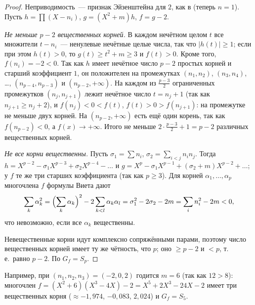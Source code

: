 \begin{proof}
Неприводимость~--- признак Эйзенштейна для $2$, как в  (теперь $n=1$). Пусть $h=\prod(X-n_i)$, $g=(X^2+m)h$, $f=g-2$.

\emph{Не меньше $p-2$ вещественных корней.} В каждом нечётном целом $t$ все множители $t-n_i$~--- ненулевые нечётные
целые числа, так что $|h(t)|\ge1$; если при этом $h(t)>0$, то $g(t)\ge t^2+m\ge3$ и $f(t)>0$. Кроме того, $f(n_i)=-2<0$.
Так как $h$ имеет нечётное число $p-2$ простых корней и старший коэффициент $1$, он положителен на промежутках
$(n_1,n_2)$, $(n_3,n_4)$, \dots, $(n_{p-4},n_{p-3})$ и $(n_{p-2},+\infty)$. На каждом из $\frac{p-3}2$ ограниченных
промежутков $(n_j,n_{j+1})$ лежит нечётное число $t=n_j+1$ (так как $n_{j+1}\ge n_j+2$), и $f(n_j)<0<f(t)$, $f(t)>0>f(n_{j+1})$:
на промежутке не меньше двух корней. На $(n_{p-2},+\infty)$ есть ещё один корень, так как $f(n_{p-2})<0$, а
$f(x)\to+\infty$. Итого не меньше $2\cdot\frac{p-3}2+1=p-2$ различных вещественных корней.

\emph{Не все корни вещественны.} Пусть $\sigma_1=\sum n_i$, $\sigma_2=\sum_{i<j}n_in_j$. Тогда $h=X^{p-2}-\sigma_1X^{p-3}+\sigma_2X^{p-4}-\dots$ и
$g=X^p-\sigma_1X^{p-1}+(\sigma_2+m)X^{p-2}+\dots$; у $f$ те же три старших коэффициента (так как $p\ge3$). Для корней
$\alpha_1,\dots,\alpha_p$ многочлена $f$ формулы Виета дают
\[
\sum_k\alpha_k^2=\Bigl(\sum_k\alpha_k\Bigr)^2-2\sum_{k<l}\alpha_k\alpha_l=\sigma_1^2-2\sigma_2-2m=\sum_in_i^2-2m<0,
\]
что невозможно, если все $\alpha_k$ вещественны.

Невещественные корни идут комплексно сопряжёнными парами, поэтому число вещественных корней имеет ту же чётность, что
$p$; оно $\ge p-2$ и $<p$, т.\,е.\ равно $p-2$. По  $G_f=S_p$.
\end{proof}

Например, при $(n_1,n_2,n_3)=(-2,0,2)$ годится $m=6$ (так как $12>8$): многочлен
$f=(X^2+6)(X^3-4X)-2=X^5+2X^3-24X-2$ имеет три вещественных корня ($\approx-1{,}974$, $-0{,}083$, $2{,}024$) и
$G_f=S_5$.

